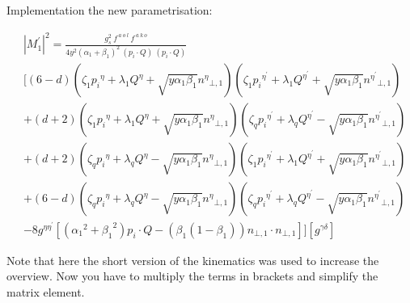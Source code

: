 Implementation the new parametrisation:

\begin{equation}
\begin{split}
&{|{M}^{\prime}_1|}^2 =\frac{g_s^2 \:f^{\:a\:o\:l}\: f^{\:a\:k\:o}}{4y^2({\alpha_1}+\beta_1)^2\:(p_i\cdot Q) \:(p_i\cdot Q)} \\
&[(6-d)(\zeta_1 {p_i}^{\eta} + \lambda_1{Q}^{\eta} + \sqrt{y\alpha_1\beta_1}{n^{\eta}}_{\bot,1})(\zeta_1 {p_i}^{{\eta}^{\prime}} + \lambda_1{Q}^{{\eta}^{\prime}} + \sqrt{y\alpha_1\beta_1}{n^{{\eta}^{\prime}}}_{\bot,1})\\
&+(d+2)(\zeta_1 {p_i}^{\eta} + \lambda_1{Q}^{\eta} + \sqrt{y\alpha_1\beta_1}{n^{\eta}}_{\bot,1})(\zeta_q {p_i}^{{\eta}^{\prime}} + \lambda_q{Q}^{{\eta}^{\prime}} - \sqrt{y\alpha_1\beta_1}{n^{{\eta}^{\prime}}}_{\bot,1})\\
&+(d+2)(\zeta_q {p_i}^{\eta} + \lambda_q{Q}^{\eta} - \sqrt{y\alpha_1\beta_1}{n^{\eta}}_{\bot,1})(\zeta_1 {p_i}^{{\eta}^{\prime}} + \lambda_1{Q}^{{\eta}^{\prime}} + \sqrt{y\alpha_1\beta_1}{n^{{\eta}^{\prime}}}_{\bot,1})\\
&+(6-d)(\zeta_q {p_i}^{\eta} + \lambda_q{Q}^{\eta} - \sqrt{y\alpha_1\beta_1}{n^{\eta}}_{\bot,1})(\zeta_q {p_i}^{{\eta}^{\prime}} + \lambda_q{Q}^{{\eta}^{\prime}} - \sqrt{y\alpha_1\beta_1}{n^{{\eta}^{\prime}}}_{\bot,1})\\
&-8g^{{\eta}{{\eta}^{\prime}}}[({\alpha_1}^2+{\beta_1}^2) p_i \cdot Q - ({\beta_1}(1-\beta_1)){n}_{\bot,1}\cdot{n}_{\bot,1}]][g^{{\gamma}{{\delta}}}]
\end{split}
\end{equation}

Note that here the short version of the kinematics was used to increase the overview. Now you have to multiply the terms in brackets and simplify the matrix element.

